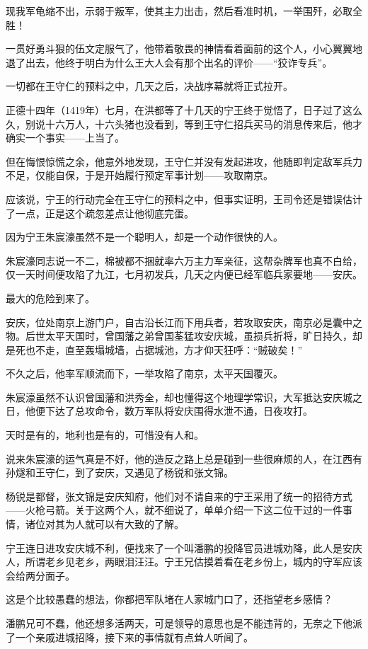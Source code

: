 \begin{multicols}{\theparacolNo}
		现我军龟缩不出，示弱于叛军，使其主力出击，然后看准时机，一举围歼，必取全胜！

		一贯好勇斗狠的伍文定服气了，他带着敬畏的神情看着面前的这个人，小心翼翼地退了出去，他终于明白为什么王大人会有那个出名的评价——“狡诈专兵”。

		一切都在王守仁的预料之中，几天之后，决战序幕就将正式拉开。

		正德十四年（1419年）七月，在洪都等了十几天的宁王终于觉悟了，日子过了这么久，别说十六万人，十六头猪也没看到，等到王守仁招兵买马的消息传来后，他才确实一个事实——上当了。

		但在悔恨惊慌之余，他意外地发现，王守仁并没有发起进攻，他随即判定敌军兵力不足，仅能自保，于是开始履行预定军事计划——攻取南京。

		应该说，宁王的行动完全在王守仁的预料之中，但事实证明，王司令还是错误估计了一点，正是这个疏忽差点让他彻底完蛋。

		因为宁王朱宸濠虽然不是一个聪明人，却是一个动作很快的人。

		朱宸濠同志说一不二，棉被都不捆就率六万主力军亲征，这帮杂牌军也真不白给，仅一天时间便攻陷了九江，七月初发兵，几天之内便已经军临兵家要地——安庆。

		最大的危险到来了。

		安庆，位处南京上游门户，自古沿长江而下用兵者，若攻取安庆，南京必是囊中之物。后世太平天国时，曾国藩之弟曾国荃猛攻安庆城，虽损兵折将，旷日持久，却是死也不走，直至轰塌城墙，占据城池，方才仰天狂呼：“贼破矣！”

		不久之后，他率军顺流而下，一举攻陷了南京，太平天国覆灭。

		朱宸濠虽然不认识曾国藩和洪秀全，却也懂得这个地理学常识，大军抵达安庆城之日，他便下达了总攻命令，数万军队将安庆围得水泄不通，日夜攻打。

		天时是有的，地利也是有的，可惜没有人和。

		说来朱宸濠的运气真是不好，他的造反之路上总是碰到一些很麻烦的人，在江西有孙燧和王守仁，到了安庆，又遇见了杨锐和张文锦。

		杨锐是都督，张文锦是安庆知府，他们对不请自来的宁王采用了统一的招待方式——火枪弓箭。关于这两个人，就不细说了，单单介绍一下这二位干过的一件事情，诸位对其为人就可以有大致的了解。

		宁王连日进攻安庆城不利，便找来了一个叫潘鹏的投降官员进城劝降，此人是安庆人，所谓老乡见老乡，两眼泪汪汪。宁王兄估摸着看在老乡份上，城内的守军应该会给两分面子。

		这是个比较愚蠢的想法，你都把军队堵在人家城门口了，还指望老乡感情？

		潘鹏兄可不蠢，他还想多活两天，可是领导的意思也是不能违背的，无奈之下他派了一个亲戚进城招降，接下来的事情就有点耸人听闻了。


\end{multicols}
